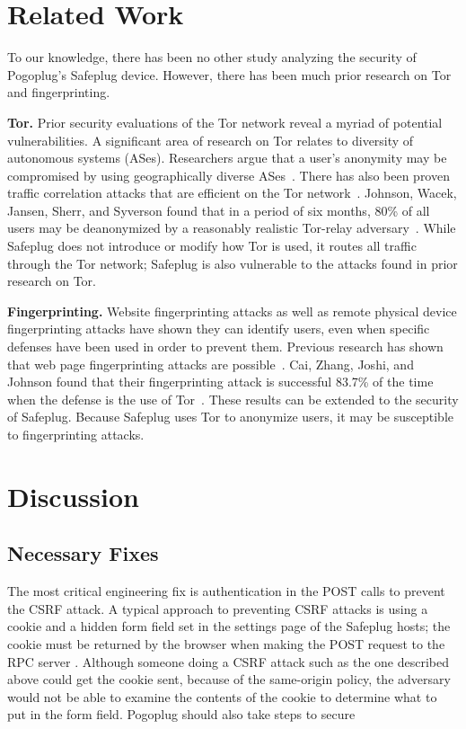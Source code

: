 \documentclass[letterpaper,twocolumn,10pt]{article}
\begin{document}
\section{Related Work}
To our knowledge, there has been no other study analyzing the security of Pogoplug's Safeplug device.  However, there has been much prior research on Tor~\cite{tor} and fingerprinting.

{\bf Tor.} Prior security evaluations of the Tor network reveal a myriad of potential vulnerabilities.  A significant area of research on Tor relates to diversity of autonomous systems (ASes).  Researchers argue that a user's anonymity may be compromised by using geographically diverse ASes~\cite{feamster, murdoch2}.  There has also been proven traffic correlation attacks that are efficient on the Tor network~\cite{murdoch, overlier}.  Johnson, Wacek, Jansen, Sherr, and Syverson found that in a period of six months, 80\% of all users may be deanonymized by a reasonably realistic Tor-relay adversary~\cite{tor2}.  While Safeplug does not introduce or modify how Tor is used, it routes all traffic through the Tor network; Safeplug is also vulnerable to the attacks found in prior research on Tor.  

{\bf Fingerprinting.}  Website fingerprinting attacks as well as remote physical device fingerprinting attacks have shown they can identify users, even when specific defenses have been used in order to prevent them. Previous research has shown that web page fingerprinting attacks are possible~\cite{dyer, herrmann, panchenko}.  Cai, Zhang, Joshi, and Johnson found that their fingerprinting attack is successful 83.7\% of the time when the defense is the use of Tor~\cite{fingerprint1}.  These results can be extended to the security of Safeplug.  Because Safeplug uses Tor to anonymize users, it may be susceptible to fingerprinting attacks.

\section{Discussion}
\subsection{Necessary Fixes}
The most critical engineering fix is authentication in the POST calls to prevent the CSRF attack.  A typical approach to preventing CSRF attacks is using a cookie and a hidden form field set in the settings page of the Safeplug hosts; the cookie must be returned by the browser when making the POST request to the RPC server \cite{csrfdef}.  Although someone doing a CSRF attack such as the one described above could get the cookie sent, because of the same-origin policy, the adversary would not be able to examine the contents of the cookie to determine what to put in the form field. Pogoplug should also take steps to secure
\end{document}
